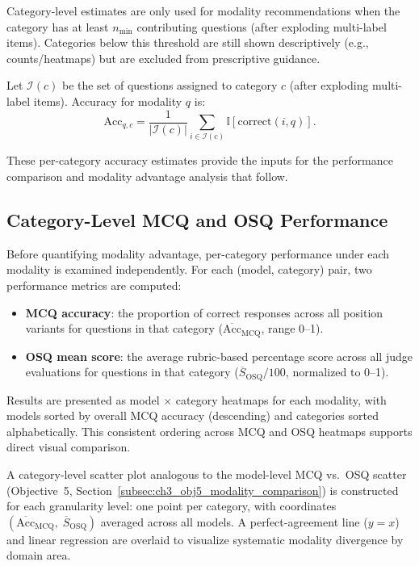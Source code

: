 Category-level estimates are only used for modality recommendations when the category has at least $n_{\min}$ contributing questions (after exploding multi-label items). Categories below this threshold are still shown descriptively (e.g., counts/heatmaps) but are excluded from prescriptive guidance.

Let $\mathcal{I}(c)$ be the set of questions assigned to category $c$ (after exploding multi-label items). Accuracy for modality $q$ is:
\[
\text{Acc}_{q,c}=\frac{1}{|\mathcal{I}(c)|}\sum_{i\in \mathcal{I}(c)} \mathbb{I}[\text{correct}(i,q)].
\]

These per-category accuracy estimates provide the inputs for the performance comparison and modality advantage analysis that follow.


\subsection{Category-Level MCQ and OSQ Performance}
\label{subsec:ch3_obj7_performance}

Before quantifying modality advantage, per-category performance under each modality is examined independently. For each (model, category) pair, two performance metrics are computed:

\begin{itemize}[nosep]
    \item \textbf{MCQ accuracy}: the proportion of correct responses across all position variants for questions in that category ($\overline{\text{Acc}}_{\text{MCQ}}$, range 0--1).
    \item \textbf{OSQ mean score}: the average rubric-based percentage score across all judge evaluations for questions in that category ($\overline{S}_{\text{OSQ}} / 100$, normalized to 0--1).
\end{itemize}

Results are presented as model $\times$ category heatmaps for each modality, with models sorted by overall MCQ accuracy (descending) and categories sorted alphabetically. This consistent ordering across MCQ and OSQ heatmaps supports direct visual comparison.

A category-level scatter plot analogous to the model-level MCQ vs.\ OSQ scatter (Objective~5, Section~\ref{subsec:ch3_obj5_modality_comparison}) is constructed for each granularity level: one point per category, with coordinates $(\overline{\text{Acc}}_{\text{MCQ}},\; \overline{S}_{\text{OSQ}})$ averaged across all models. A perfect-agreement line ($y = x$) and linear regression are overlaid to visualize systematic modality divergence by domain area.


